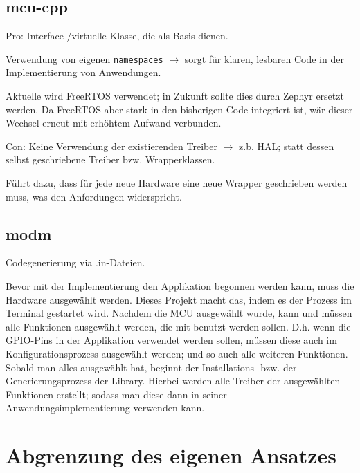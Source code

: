 \subsection{mcu-cpp}
Pro:
Interface-/virtuelle Klasse, die als Basis dienen.

Verwendung von eigenen \texttt{namespaces} $\rightarrow$ sorgt für klaren, lesbaren Code in der Implementierung von Anwendungen.

Aktuelle wird FreeRTOS verwendet; in Zukunft sollte dies durch Zephyr ersetzt werden.
Da FreeRTOS aber stark in den bisherigen Code integriert ist, wär dieser Wechsel erneut mit erhöhtem Aufwand verbunden.



Con:
Keine Verwendung der existierenden Treiber $\rightarrow$ z.b. HAL; statt dessen selbst geschriebene Treiber bzw. Wrapperklassen.

Führt dazu, dass für jede neue Hardware eine neue Wrapper geschrieben werden muss, was den Anfordungen widerspricht.

\subsection{modm}
Codegenerierung via .in-Dateien.

Bevor mit der Implementierung den Applikation begonnen werden kann, muss die Hardware ausgewählt werden.
Dieses Projekt macht das, indem es der Prozess im Terminal gestartet wird.
Nachdem die MCU ausgewählt wurde, kann und müssen alle Funktionen ausgewählt werden, die mit benutzt werden sollen.
D.h. wenn die GPIO-Pins in der Applikation verwendet werden sollen, müssen diese auch im Konfigurationsprozess ausgewählt werden; und so auch alle weiteren Funktionen.
Sobald man alles ausgewählt hat, beginnt der Installations- bzw. der Generierungsprozess der Library. 
Hierbei werden alle Treiber der ausgewählten Funktionen erstellt; sodass man diese dann in seiner Anwendungsimplementierung verwenden kann.


\section{Abgrenzung des eigenen Ansatzes}



